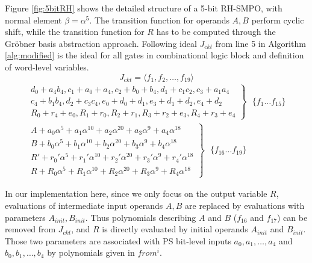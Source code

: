 \begin{Example}
\label{ex:RHSMPO}
Figure \ref{fig:5bitRH} shows the detailed structure of a 5-bit RH-SMPO, with normal element $\beta = \alpha^5$. The transition function for
operands $A,B$ perform cyclic shift, while the transition function for $R$ has to be computed through the Gr\"obner basis
abstraction approach. Following ideal $J_{ckt}$ from line 5 in Algorithm \ref{alg:modified} is the ideal for 
all gates in combinational logic block and definition of word-level variables.
$$J_{ckt} = \langle f_1,f_2,\dots,f_{19}\rangle$$
\begin{eqnarray*}
 \left. 
\begin{aligned}
d_0+a_4b_4, c_1+a_0+a_4, c_2+b_0+b_4, d_1+c_1c_2, c_3+a_1a_4\\
c_4+b_1b_4, d_2+c_3c_4, e_0+d_0+d_1, e_3+d_1+d_2, e_4+d_2 \\
R_0+r_4+e_0, R_1+r_0, R_2+r_1, R_3+r_2+e_3, R_4+r_3+e_4
\end{aligned}\right\} ~~~\{f_1\dots f_{15}\}\\
 \left.
\begin{aligned}
 A+a_0\alpha^5+a_1\alpha^{10}+a_2\alpha^{20}+a_3\alpha^9+a_4\alpha^{18}\\
		  B+b_0\alpha^5+b_1\alpha^{10}+b_2\alpha^{20}+b_3\alpha^9+b_4\alpha^{18}\\
		  R'+r_0'\alpha^5+r_1'\alpha^{10}+r_2'\alpha^{20}+r_3'\alpha^9+r_4'\alpha^{18}\\
		  R+R_0\alpha^5+R_1\alpha^{10}+R_2\alpha^{20}+R_3\alpha^9+R_4\alpha^{18}
		 \end{aligned}\right\} ~~~\{f_{16}\dots f_{19}\}
\end{eqnarray*}

In our implementation here, since we only focus on the output variable $R$, evaluations of intermediate input 
operands $A, B$ are replaced by evaluations with parameters $A_{init},B_{init}$. 
Thus polynomials describing $A$ and $B$ ($f_{16}$ and $f_{17}$) can be removed from $J_{ckt}$, and $R$ is directly
evaluated by initial operands $A_{init}$ and $B_{init}$. Those two parameters are associated with PS bit-level inputs
$a_0,a_1,\dots,a_4$ and $b_0,b_1,\dots,b_4$ by polynomials given in $from^i$.


\end{Example}
